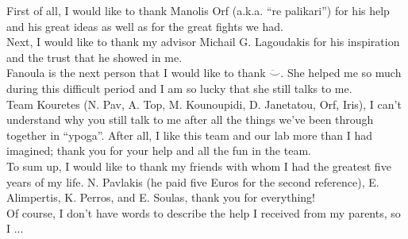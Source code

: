 \begin{acknowledgementslong}

\noindent
First of all, I would like to thank Manolis Orf (a.k.a. ``re palikari'') for his help and his great ideas as well as for the great fights we had. \\

\noindent
Next, I would like to thank my advisor Michail G. Lagoudakis for his inspiration and the trust that he showed in me.\\

\noindent
Fanoula is the next person that I would like to thank $\ddot\smile$. She helped me so much during this difficult period and I am so lucky that she still talks to me.\\

\noindent
Team Kouretes (N. Pav, A. Top, M. Kounoupidi, D. Janetatou, Orf, Iris), I can't understand why you still talk to me after all the things we've been through together in ``ypoga''. After all, I like this team and our lab more than I had imagined; thank you for your help and all the fun in the team.\\

\noindent
To sum up, I would like to thank my friends with whom I had the greatest five years of my life. N. Pavlakis (he paid five Euros for the second reference), E. Alimpertis, K. Perros, and E. Soulas, thank you for everything!\\

\noindent
Of course, I don't have words to describe the help I received from my parents, so I ...

\end{acknowledgementslong}